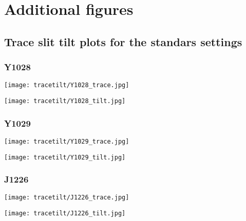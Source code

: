 \section{Additional figures}
\label{sec:extrafigs}

\subsection{Trace slit tilt plots for the standars settings}




\subsubsection{Y1028}
\texttt{[image: tracetilt/Y1028\_trace.jpg]}

\texttt{[image: tracetilt/Y1028\_tilt.jpg]}

\subsubsection{Y1029}
\texttt{[image: tracetilt/Y1029\_trace.jpg]}

\texttt{[image: tracetilt/Y1029\_tilt.jpg]}

\subsubsection{J1226}
\texttt{[image: tracetilt/J1226\_trace.jpg]}

\texttt{[image: tracetilt/J1226\_tilt.jpg]}

